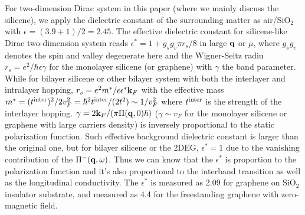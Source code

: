 \documentclass[UTF8,a4paper]{article}
\begin{document}
\begin{large}
For two-dimension Dirac system in this paper (where we mainly discuss the silicene), we apply the dielectric constant of the surrounding matter as air/SiO$_{2}$
with $\epsilon=(3.9+1)/2=2.45$.
The effective dielectric constant for silicene-like Dirac two-dimension system 
reads $\epsilon^{*}=1+g_{s}g_{v}\pi r_{s}/8$\cite{Hwang E H} in large ${\bf q}$ or $\mu$,
where $g_{s}g_{v}$ denotes the spin and valley degenerate here and the Wigner-Seitz radiu $r_{s}=e^{2}/\hbar\epsilon\gamma$ for the monolayer silicene
(or graphene)
with $\gamma$ the band parameter.
While for bilayer silicene or other bilayer system with both the interlayer and intralayer hopping, 
$r_{s}=e^{2}m^{*}/\epsilon\epsilon^{*}{\bf k}_{F}$
with the effective mass $m^{*}=(t^{{\rm inter}})^{2}/2 v_{F}^{2}=\hbar^{2}t^{{\rm inter}}/(2t^{2})\sim 1/v_{F}^{2}$
where $t^{{\rm inter}}$ is the strength of the interlayer hopping.
$\gamma=2{\bf k}_{F}/(\pi\Pi({\bf q},0)\hbar)$ ($\gamma\sim v_{F}$ for the monolayer silicene or graphene with large carriers density) 
is inversely proportional to the static polarization function\cite{Wu C H3}.
Such effective background dielectric constant
is larger than the original one, but for bilayer silicene or the 2DEG, $\epsilon^{*}=1$\cite{Hwang E H2}
due to the vanishing contribution of the $\Pi^{-}({\bf q},\omega)$\cite{Lv M,Sensarma R}.
Thus we can know that the $\epsilon^{*}$ is proportion to the polarization function
and it's also proportional to the interband transition as well as the longitudinal conductivity.
The $\epsilon^{*}$ is measured as 2.09 for graphene on SiO$_{2}$ insulator substrate\cite{Sodemann I},
and measured as 4.4\cite{Pyatkovskiy P K} for the freestanding graphene with zero-magnetic field.



\end{large}
\end{document}
